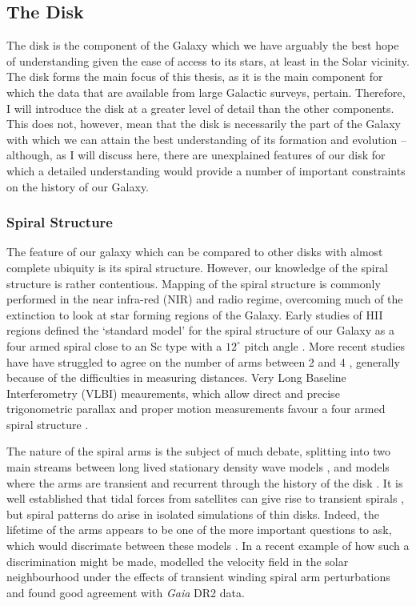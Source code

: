 \subsection{The Disk}

The disk is the component of the Galaxy which we have arguably the best hope of understanding given the ease of access to its stars, at least in the Solar vicinity. The disk forms the main focus of this thesis, as it is the main component for which the data that are available from large Galactic surveys, pertain. Therefore, I will introduce the disk at a greater level of detail than the other components. This does not, however, mean that the disk is necessarily the part of the Galaxy with which we can attain the best understanding of its formation and evolution -- although, as I will discuss here, there are unexplained features of our disk for which a detailed understanding would provide a number of important constraints on the history of our Galaxy. 

\subsubsection{Spiral Structure}
The feature of our galaxy which can be compared to other disks with almost complete ubiquity is its spiral structure. However, our knowledge of the spiral structure is rather contentious. Mapping of the spiral structure is commonly performed in the near infra-red (NIR) and radio regime, overcoming much of the extinction to look at star forming regions of the Galaxy. Early studies of HII regions defined the `standard model' for the spiral structure of our Galaxy as a four armed spiral close to an Sc type with a $12^{\circ}$ pitch angle  \citep{1976A&A....49...57G}. More recent studies have have struggled to agree on the number of arms between 2 and 4 \citep[e.g.][]{1976A&A....46..261S,1980ApJ...239L..53C,1981ApJ...250..551B,1995ApJ...454..119V,2000A&A...358L..13D,2003A&A...397..133R}, generally because of the difficulties in measuring distances. Very Long Baseline Interferometry (VLBI) meaurements, which allow direct and precise trigonometric parallax and proper motion measurements favour a four armed spiral structure \citep{2009ApJ...700..137R,2014ApJ...783..130R}.

The nature of the spiral arms is the subject of much debate, splitting into two main streams between long lived stationary density wave models \citep[e.g.][]{1964ApJ...140..646L,1996ssgd.book.....B}, and models where the arms are transient and recurrent through the history of the disk \citep[e.g.][]{1981seng.proc..111T,1984ApJ...282...61S}. It is well established that tidal forces from satellites can give rise to transient spirals \citep[e.g.][]{2010MNRAS.403..625D}, but spiral patterns do arise in isolated simulations of thin disks. Indeed, the lifetime of the arms appears to be one of the more important questions to ask, which would discrimate between these models \citep{2011MNRAS.410.1637S}. In a recent example of how such a discrimination might be made, \citet{2018MNRAS.481.3794H} modelled the velocity field in the solar neighbourhood under the effects of transient winding spiral arm perturbations and found good agreement with \emph{Gaia} DR2 data. 

